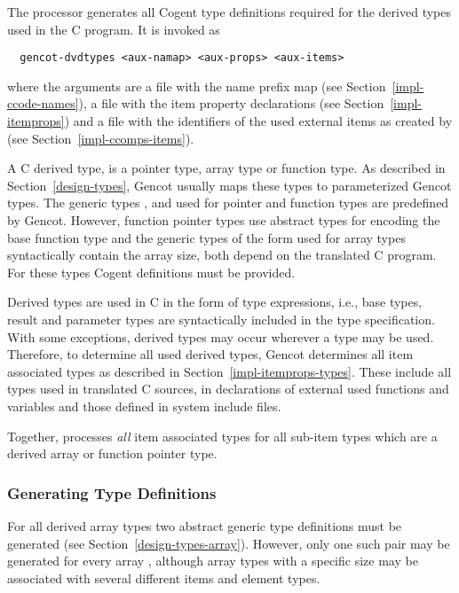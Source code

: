 The processor  generates all Cogent type definitions required for the derived types
used in the C program. It is invoked as
\begin{verbatim}
  gencot-dvdtypes <aux-namap> <aux-props> <aux-items>
\end{verbatim}
where the arguments are a file  with the name prefix map 
(see Section~\ref{impl-ccode-names}), a file  with the item property declarations (see 
Section~\ref{impl-itemprops}) and a file  with the identifiers of the used external items as created 
by  (see Section~\ref{impl-ccomps-items}).

A C derived type, is a pointer type, array type or function type. As described in 
Section~\ref{design-types}, Gencot usually maps these types to parameterized Gencot types. The generic types ,
 and  used for pointer and function types are predefined by Gencot. However, function
pointer types use abstract types for encoding the base function type and the generic 
types of the form  used for array types syntactically contain the array size, both
depend on the translated C program. For these types Cogent definitions must be provided.

Derived types are used in C in the form of type expressions, i.e., base types, result and parameter types are 
syntactically included in the type specification. With some exceptions, derived types may occur wherever a type
may be used. Therefore, to determine all used derived types, Gencot determines all item associated types as
described in Section~\ref{impl-itemprops-types}. These include all types used 
in translated C sources, in declarations of external used functions and variables and those defined in system
include files.

Together,  processes
\textit{all} item associated types for all sub-item types which are a derived array or function pointer type.

\subsubsection{Generating Type Definitions}

For all derived array types two abstract generic type definitions must be generated
(see Section~\ref{design-types-array}). However, only one such pair may be generated for every array , 
although array types with a specific size may be associated with several different items and element types.

